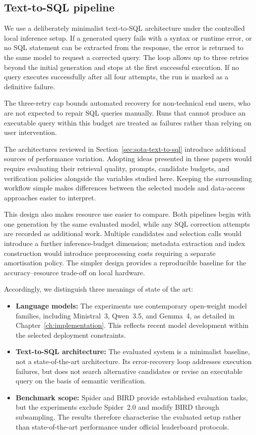 \subsection{Text-to-SQL pipeline} \label{sec:minimalist-text-to-sql}

We use a deliberately minimalist text-to-SQL architecture under the controlled local inference setup. If a
generated query fails with a syntax or runtime error, or no SQL statement can be extracted from the response,
the error is returned to the same model to request a corrected query. The loop allows up to three retries
beyond the initial generation and stops at the first successful execution. If no query executes successfully
after all four attempts, the run is marked as a definitive failure.

The three-retry cap bounds automated recovery for non-technical end users, who are not expected to repair SQL
queries manually. Runs that cannot produce an executable query within this budget are treated as failures
rather than relying on user intervention.

The architectures reviewed in Section~\ref{sec:sota-text-to-sql} introduce additional sources of performance
variation. Adopting ideas presented in these papers would require evaluating their retrieval quality,
prompts, candidate budgets, and verification policies alongside the variables studied here. Keeping the
surrounding workflow simple makes differences between the selected models and data-access approaches easier
to interpret.

This design also makes resource use easier to compare. Both pipelines begin with one generation by the same
evaluated model, while any SQL correction attempts are recorded as additional work. Multiple candidates and
selection calls would introduce a further inference-budget dimension; metadata extraction and index
construction would introduce preprocessing costs requiring a separate amortisation policy. The simpler design
provides a reproducible baseline for the accuracy--resource trade-off on local hardware.

Accordingly, we distinguish three meanings of state of the art:
\begin{itemize}
  \item \textbf{Language models:} The experiments use contemporary open-weight model families, including
    Ministral~3, Qwen~3.5, and Gemma~4, as detailed in Chapter~\ref{ch:implementation}. This reflects recent
    model development within the selected deployment constraints.
  \item \textbf{Text-to-SQL architecture:} The evaluated system is a minimalist baseline, not a
    state-of-the-art architecture. Its error-recovery loop addresses execution failures, but does not search
    alternative candidates or revise an executable query on the basis of semantic verification.
  \item \textbf{Benchmark scope:} Spider and BIRD provide established evaluation tasks, but the experiments
    exclude Spider~2.0 and modify BIRD through subsampling. The results therefore characterise the evaluated
    setup rather than state-of-the-art performance under official leaderboard protocols.
\end{itemize}

